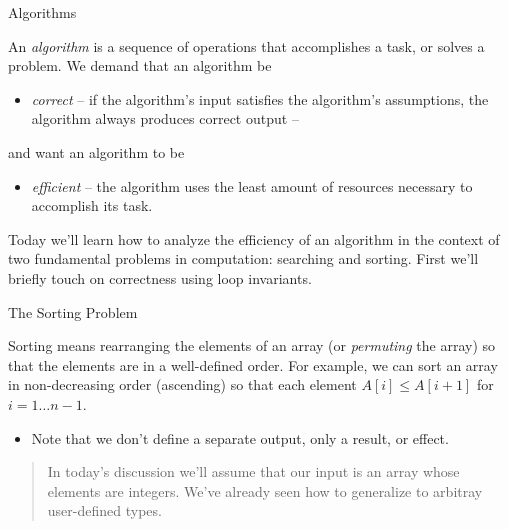 \documentclass{beamer}
\begin{document}
\begin{frame}[fragile]{Algorithms}

An {\it algorithm} is a sequence of operations that accomplishes a task, or solves a problem.  We demand that an algorithm be
\begin{itemize}
\item {\it correct} -- if the algorithm's input satisfies the algorithm's assumptions, the algorithm always produces correct output --
\end{itemize}
and want an algorithm to be
\begin{itemize}
\item {\it efficient} -- the algorithm uses the least amount of resources necessary to accomplish its task.
\end{itemize}

Today we'll learn how to analyze the efficiency of an algorithm in the context of two fundamental problems in computation: searching and sorting.  First we'll briefly touch on correctness using loop invariants.

\end{frame}

\begin{frame}[fragile]{The Sorting Problem}

Sorting means rearranging the elements of an array (or {\it permuting} the array) so that the elements are in a well-defined order.  For example, we can sort an array in non-decreasing order (ascending) so that each element $A[i] \le A[i + 1]$ for $i = 1 \ldots n - 1$.


\begin{itemize}
\item Note that we don't define a separate output, only a result, or effect.
\end{itemize}

\begin{quote}
In today's discussion we'll assume that our input is an array whose elements are integers.  We've already seen how to generalize to arbitray user-defined types.
\end{quote}

\end{frame}
\end{document}
